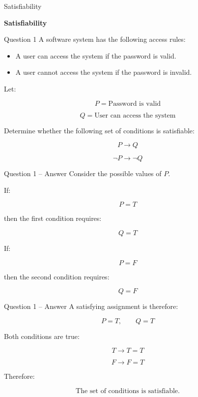 \begin{frame}{Satisfiability}
\begin{center}
\vspace{1.5cm}
{\Huge\textbf{Satisfiability}}
\end{center}
\end{frame}


\begin{frame}{Question 1}
A software system has the following access rules:

\begin{itemize}
\item A user can access the system if the password is valid.
\item A user cannot access the system if the password is invalid.
\end{itemize}

Let:

$$
P = \text{Password is valid}
$$

$$
Q = \text{User can access the system}
$$

Determine whether the following set of conditions is satisfiable:

$$
P \rightarrow Q
$$

$$
\neg P \rightarrow \neg Q
$$

\end{frame}

\begin{frame}{Question 1 -- Answer}
Consider the possible values of $P$.

If:

$$
P=T
$$

then the first condition requires:

$$
Q=T
$$

If:

$$
P=F
$$

then the second condition requires:

$$
Q=F
$$

\end{frame}

\begin{frame}{Question 1 -- Answer}
A satisfying assignment is therefore:

$$
P=T,\qquad Q=T
$$

Both conditions are true:

$$
T\rightarrow T = T
$$

$$
F\rightarrow F = T
$$

Therefore:

$$
\boxed{\text{The set of conditions is satisfiable.}}
$$

\end{frame}

